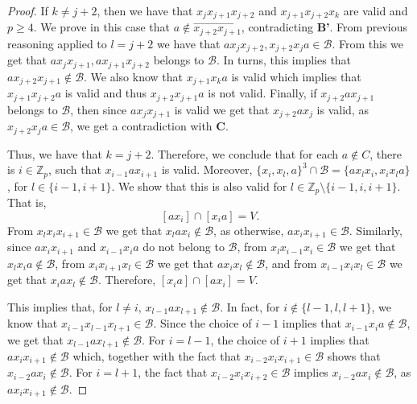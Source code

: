 \documentclass{article}
\newcommand{\Z}{\mathbb{Z}}
\newcommand{\calb}{\mathcal{B}}
\begin{document}
\begin{proof}
    If $k\neq j+2$, then we have that $x_jx_{j+1}x_{j+2}$ and $x_{j+1}x_{j+2}x_k$ are valid and $p\geq 4$. We prove in this case that $a\notin \overrightarrow{x_{j+2}x_{j+1}}$, contradicting \textbf{B'}. From previous reasoning applied to $l=j+2$ we have that $ax_jx_{j+2},x_{j+2}x_ja\in \calb$. From this we get that $ax_jx_{j+1},ax_{j+1}x_{j+2}$ belongs to $\calb$. In turns, this implies that $ax_{j+2}x_{j+1}\notin \calb$. We also know that $x_{j+1}x_ka$ is valid which implies that $x_{j+1}x_{j+2}a$ is valid and thus $x_{j+2}x_{j+1}a$ is not valid. Finally, if $x_{j+2}ax_{j+1}$ belongs to $\calb$, then since $ax_jx_{j+1}$ is valid we get that $x_{j+2}ax_j$ is valid, as $x_{j+2}x_ja\in \calb$, we get a contradiction with \textbf{C}.
    
	Thus, we have that $k=j+2$. Therefore, we conclude that for each $a\notin C$, there is $i \in \Z_p$, such that $x_{i-1}ax_{i+1}$ is valid. Moreover, $\{x_{i},x_l,a\}^3\cap \calb=\{ax_lx_i,x_ix_la\}$, for $l\in \{i-1,i+1\}$. We show that this is also valid for $l \in \Z_p \setminus \{i-1,i,i+1\}$. That is,     $$[ax_i]\cap[x_ia]=V.$$ From $x_lx_ix_{i+1}\in \calb$ we get that $x_lax_i\notin \calb$, as otherwise, $ax_ix_{i+1}\in \calb$. Similarly, since $ ax_ix_{i+1}$ and $x_{i-1}x_ia$ do not belong to $\calb$, from $x_lx_{i-1}x_{i}\in \calb$ we get that $x_lx_ia\notin \calb$, from $x_ix_{i+1}x_l\in \calb$ we get that $ax_ix_{l}\notin \calb$, and from $x_{i-1}x_{i}x_l\in \calb$ we get that $x_iax_{l}\notin \calb$.  Therefore, $[x_ia]\cap [ax_i]=V$.

    This implies that, for $l\neq i$, $x_{l-1}ax_{l+1}\notin \calb$. In fact, for $i\notin \{l-1,l,l+1\}$, we know that  $x_{i-1}x_{l-1}x_{l+1}\in \calb$. Since the choice of $i-1$ implies that $x_{i-1}x_ia\notin \calb$, we get that $x_{l-1}ax_{l+1}\notin \calb$. For $i=l-1$, the choice of $i+1$  implies that $ax_ix_{i+1}\notin \calb$ which, together with the fact that $x_{i-2}x_ix_{i+1}\in \calb$ shows that $x_{i-2}ax_i\notin \calb$. For $i=l+1$, the fact that $x_{i-2}x_{i}x_{i+2}\in \calb$ implies $x_{i-2}ax_i\notin \calb$, as $ax_ix_{i+1}\notin \calb$. 
        


\end{proof}
\end{document}
